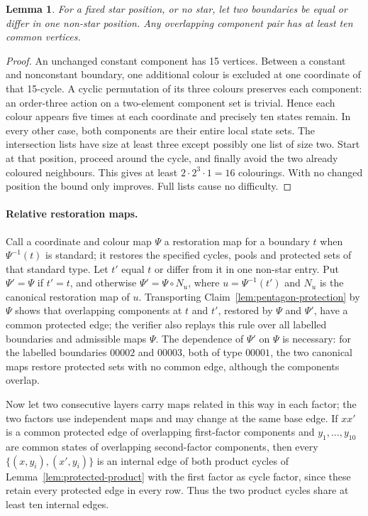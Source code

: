 \documentclass[11pt]{article}
\newtheorem{lemma}[theorem]{Lemma}
\theoremstyle{remark}
\numberwithin{equation}{section}
\numberwithin{table}{section}
\begin{document}
\begin{lemma}\label{lem:pentagon-overlap}
For a fixed star position, or no star, let two boundaries be equal or
differ in one non-star position. Any overlapping component pair has
at least ten common vertices.
\end{lemma}
\begin{proof}
An unchanged constant component has 15 vertices. Between a constant
and nonconstant boundary, one additional colour is excluded at one
coordinate of that 15-cycle. A cyclic permutation of its three colours
preserves each component: an order-three action on a two-element
component set is trivial. Hence each colour appears five times at
each coordinate and precisely ten states remain.
In every other case, both components are their entire local state
sets. The intersection lists have size at least three except possibly
one list of size two. Start at that position, proceed around the
cycle, and finally avoid the two already coloured neighbours.
This gives at least $2\cdot2^3\cdot1=16$ colourings. With no changed
position the bound only improves. Full lists cause no difficulty.
\end{proof}

\paragraph{Relative restoration maps.}
Call a coordinate and colour map $\Psi$ a restoration map for a
boundary $t$ when $\Psi^{-1}(t)$ is standard; it restores the
specified cycles, pools and protected sets of that standard type. Let
$t'$ equal $t$ or differ from it in one non-star entry. Put
$\Psi'=\Psi$ if $t'=t$, and otherwise $\Psi'=\Psi\circ N_u$, where
$u=\Psi^{-1}(t')$ and $N_u$ is the canonical restoration map of $u$.
Transporting Claim~\ref{lem:pentagon-protection} by $\Psi$ shows that
overlapping components at $t$ and $t'$, restored by $\Psi$ and
$\Psi'$, have a common protected edge; the verifier also replays this
rule over all labelled boundaries and admissible maps $\Psi$. The
dependence of $\Psi'$ on $\Psi$ is necessary: for the labelled
boundaries $00002$ and $00003$, both of type $00001$, the two canonical
maps restore protected sets with no common edge, although the
components overlap.

Now let two consecutive layers carry maps related in this way in each
factor; the two factors use independent maps and may change at the same
base edge. If $xx'$ is a common protected edge of overlapping
first-factor components and $y_1,\ldots,y_{10}$ are common states of
overlapping second-factor components, then every
$\{(x,y_i),(x',y_i)\}$ is an internal edge of both product cycles of
Lemma~\ref{lem:protected-product} with the first factor as cycle
factor, since these retain every protected edge in every row. Thus the
two product cycles share at least ten internal edges.
\end{document}
